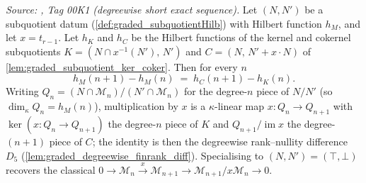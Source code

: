 \begin{lemma}\leanok
  \label{lem:graded_subquotient_degreewise_diff}
  \textit{Source: \cite{stacks-project}, Tag 00K1 (degreewise short exact sequence).}
  Let \((N, N')\) be a subquotient datum (\cref{def:graded_subquotientHilb}) with
  Hilbert function \(h_M\), and let \(x = t_{r-1}\). Let \(h_K\) and \(h_C\) be the
  Hilbert functions of the kernel and cokernel subquotients
  \(K = (N \cap x^{-1}(N'),\, N')\) and \(C = (N,\, N' + x \cdot N)\) of
  \cref{lem:graded_subquotient_ker_coker}. Then for every \(n\)
  \[
    h_M(n+1) - h_M(n) \;=\; h_C(n+1) - h_K(n).
  \]
  Writing \(Q_n = (N \cap \mathcal{M}_n)/(N' \cap \mathcal{M}_n)\) for the
  degree-\(n\) piece of \(N/N'\) (so \(\dim_\kappa Q_n = h_M(n)\)), multiplication by
  \(x\) is a \(\kappa\)-linear map \(x : Q_n \to Q_{n+1}\) with
  \(\ker(x : Q_n \to Q_{n+1})\) the degree-\(n\) piece of \(K\) and
  \(Q_{n+1}/\operatorname{im} x\) the degree-\((n+1)\) piece of \(C\); the identity is
  then the degreewise rank--nullity difference \(D_5\)
  (\cref{lem:graded_degreewise_finrank_diff}). Specialising to \((N, N') = (\top,
  \bot)\) recovers the classical \(0 \to \mathcal{M}_n \xrightarrow{x}
  \mathcal{M}_{n+1} \to \mathcal{M}_{n+1}/x\mathcal{M}_n \to 0\).
\end{lemma}

